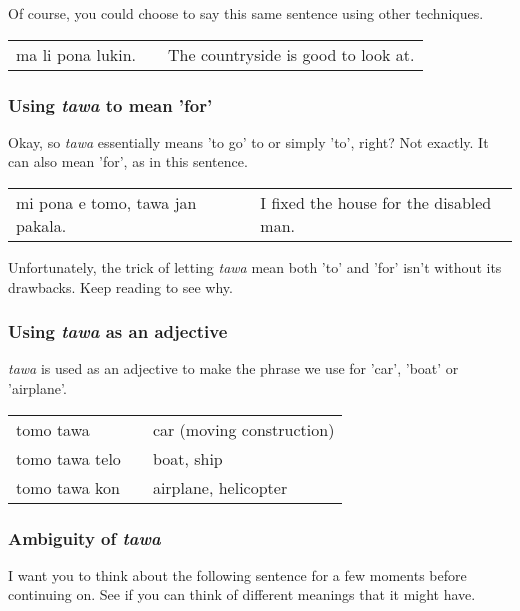 Of course, you could choose to say this same sentence using other techniques. 

\begin{supertabular}{p{5,5cm}|ll}
ma li pona lukin. && The countryside is good to look at. \\
\end{supertabular} 

\subsubsection*{Using \textit{tawa} to mean 'for'}
%
Okay, so \textit{tawa} essentially means 'to go' to or simply 'to', right? 
Not exactly. 
It can also mean 'for', as in this sentence.
 
\begin{supertabular}{p{5,5cm}|ll}
mi pona e tomo, tawa jan pakala. && I fixed the house for the disabled man. \\
\end{supertabular} 

Unfortunately, the trick of letting \textit{tawa} mean both 'to' and 'for' isn't without its drawbacks. 
Keep reading to see why. 

\subsubsection*{Using \textit{tawa} as an adjective}
%
\textit{tawa} is used as an adjective to make the phrase we use for 'car', 'boat' or 'airplane'.

\begin{supertabular}{p{5,5cm}|ll}
tomo tawa && car (moving construction) \\
tomo tawa telo && boat, ship \\
tomo tawa kon && airplane, helicopter \\
\end{supertabular} 
%
\subsubsection*{Ambiguity of \textit{tawa}}
%
I want you to think about the following sentence for a few moments before continuing on. 
See if you can think of different meanings that it might have. 

